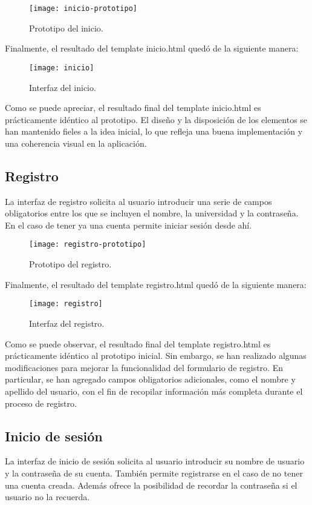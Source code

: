 \begin{figure}[htb]
\centering
\texttt{[image: inicio-prototipo]}
\caption{Prototipo del inicio.}
\label{fig:inicio-prototipo}
\end{figure}

Finalmente, el resultado del template inicio.html quedó de la siguiente manera:

\begin{figure}[htb]
\centering
\texttt{[image: inicio]}
\caption{Interfaz del inicio.}
\label{fig:inicio}
\end{figure}

Como se puede apreciar, el resultado final del template inicio.html es prácticamente idéntico al prototipo. El diseño y la disposición de los elementos se han mantenido fieles a la idea inicial, lo que refleja una buena implementación y una coherencia visual en la aplicación.

\subsection{Registro}
La interfaz de registro solicita al usuario introducir una serie de campos obligatorios entre los que se incluyen el nombre, la universidad y la contraseña. En el caso de tener ya una cuenta permite iniciar sesión desde ahí.

\begin{figure}[htb]
\centering
\texttt{[image: registro-prototipo]}
\caption{Prototipo del registro.}
\label{fig:registro-prototipo}
\end{figure}

Finalmente, el resultado del template registro.html quedó de la siguiente manera:

\begin{figure}[htb]
\centering
\texttt{[image: registro]}
\caption{Interfaz del registro.}
\label{fig:registro}
\end{figure}

Como se puede observar, el resultado final del template registro.html es prácticamente idéntico al prototipo inicial. Sin embargo, se han realizado algunas modificaciones para mejorar la funcionalidad del formulario de registro. En particular, se han agregado campos obligatorios adicionales, como el nombre y apellido del usuario, con el fin de recopilar información más completa durante el proceso de registro.

\subsection{Inicio de sesión}
La interfaz de inicio de sesión solicita al usuario introducir su nombre de usuario y la contraseña de su cuenta. También permite registrarse en el caso de no tener una cuenta creada. Además ofrece la posibilidad de recordar la contraseña si el usuario no la recuerda.

